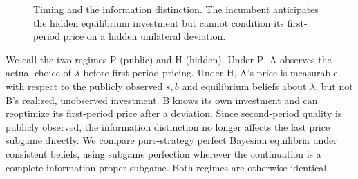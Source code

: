 \documentclass[11pt,a4paper]{article}
\numberwithin{equation}{section}
\theoremstyle{remark}
\newcommand{\PP}{\mathrm{P}}
\newcommand{\HH}{\mathrm{H}}
\begin{document}
\begin{figure}[t]
\centering
{}
\caption{Timing and the information distinction. The incumbent anticipates the hidden equilibrium investment but cannot condition its first-period price on a hidden unilateral deviation.}
\label{fig:timeline}
\end{figure}

We call the two regimes $\PP$ (public) and $\HH$ (hidden). Under $\PP$, A observes the actual choice of $\lambda$ before first-period pricing. Under $\HH$, A's price is measurable with respect to the publicly observed $s,b$ and equilibrium beliefs about $\lambda$, but not B's realized, unobserved investment. B knows its own investment and can reoptimize its first-period price after a deviation. Since second-period quality is publicly observed, the information distinction no longer affects the last price subgame directly. We compare pure-strategy perfect Bayesian equilibria under consistent beliefs, using subgame perfection wherever the continuation is a complete-information proper subgame. Both regimes are otherwise identical.
\end{document}
